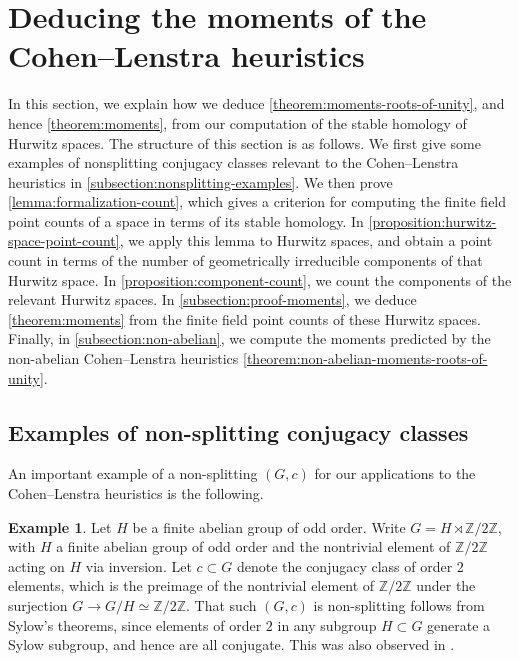 \documentclass[12 pt]{amsart}
\theoremstyle{plain}
\theoremstyle{definition}
\newtheorem{example}[theorem]{Example}
\theoremstyle{remark}
\numberwithin{equation}{section}
\begin{document}
\section{Deducing the moments of the Cohen--Lenstra heuristics}
\label{section:cohen-lenstra}

In this section, we explain how we deduce 
\autoref{theorem:moments-roots-of-unity}, and hence
\autoref{theorem:moments}, from our computation of the stable homology of
Hurwitz spaces.
The structure of this section is as follows.
We first give some examples of nonsplitting conjugacy classes relevant to the
Cohen--Lenstra heuristics in \autoref{subsection:nonsplitting-examples}.
We then prove \autoref{lemma:formalization-count}, which gives a
criterion for computing the finite field point counts of a space in terms of its
stable homology.
In \autoref{proposition:hurwitz-space-point-count}, we apply this lemma to
Hurwitz spaces, and obtain a point count in terms of the number of geometrically
irreducible components of that Hurwitz space.
In \autoref{proposition:component-count}, we count the components of the
relevant Hurwitz spaces.
In \autoref{subsection:proof-moments}, we deduce
\autoref{theorem:moments} from the finite field point counts of these Hurwitz
spaces.
Finally, in \autoref{subsection:non-abelian},
we compute the moments predicted by the non-abelian Cohen--Lenstra heuristics
\autoref{theorem:non-abelian-moments-roots-of-unity}.




\subsection{Examples of non-splitting conjugacy classes}
\label{subsection:nonsplitting-examples}
An important example of a non-splitting $(G,c)$ for our applications to the
Cohen--Lenstra heuristics is the following.
\begin{example}
	\label{example:generalized-dihedral-nonsplitting}
	Let $H$ be a finite abelian group of odd order.
	Write $G = H \rtimes \mathbb Z/2
\mathbb Z$, with $H$ a finite abelian group of odd order and the nontrivial
element of $\mathbb Z/2 \mathbb Z$ acting on
$H$ via inversion.
	Let $c \subset G$ denote the conjugacy class of order $2$ elements, which is 
the preimage of the nontrivial element of $\mathbb Z/2 \mathbb Z$ under the
surjection $G \to G/H \simeq \mathbb Z/2 \mathbb Z$.
That such $(G,c)$ is non-splitting follows from Sylow's theorems, since elements
of order $2$ in any subgroup $H \subset G$ generate a Sylow subgroup, and hence are all conjugate.
This was also observed in \cite[Lemma 3.2]{EllenbergVW:cohenLenstra}.
\end{example}
\end{document}
